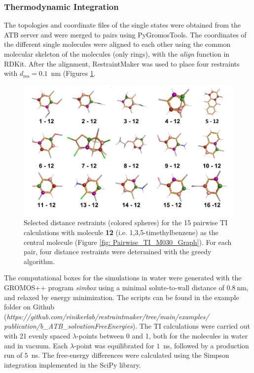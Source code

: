 \subsubsection{Thermodynamic Integration}
The topologies and coordinate files of the single states were obtained from the ATB server\cite{Stroet2018} and were merged to pairs using PyGromosTools\cite{Lehner2021}. 
The coordinates of the different single molecules were aligned to each other using the common molecular skeleton of the molecules (only rings), with the \textit{align} function in RDKit\cite{Landrum2021}. After the alignment, RestraintMaker was used to place four restraints with $d_\text{res} = 0.1$~nm (Figures \ref{SIfig: Pairwise_TI_M030_Graph}. 

\begin{figure}[H]
    \centering
    \includegraphics[width=\textwidth]{fig/results/pairwise/restraintPlacement/Restraints_PairwiseTI_M030Graph.png}
    \caption{Selected distance restraints (colored spheres) for the 15 pairwise TI calculations with molecule \textbf{12} (i.e. 1,3,5-timethylbenzene) as the central molecule (Figure \ref{fig: Pairwise_TI_M030_Graph}). For each pair, four distance restraints were determined with the greedy algorithm.}
    \label{SIfig: Pairwise_TI_M030_Graph}
\end{figure}


The computational boxes for the simulations in water were generated with the GROMOS++ \cite{Eichenberger2011} program \textit{simbox} using a minimal solute-to-wall distance of $0.8~$nm, and relaxed by energy minimization. The scripts can be found in the example folder on Github (\textit{https://github.com/rinikerlab/restraintmaker/tree/main/examples/\\publication/b\_ATB\_solvationFreeEnergies}).
The TI calculations were carried out with 21 evenly spaced $\lambda$-points between 0 and 1, both for the molecules in water and in vacuum. Each $\lambda$-point was equilibrated for $1$~ns, followed by a production run of $5$~ns. The free-energy differences were calculated using the Simpson integration implemented in the SciPy library.\cite{Virtanen2020}


